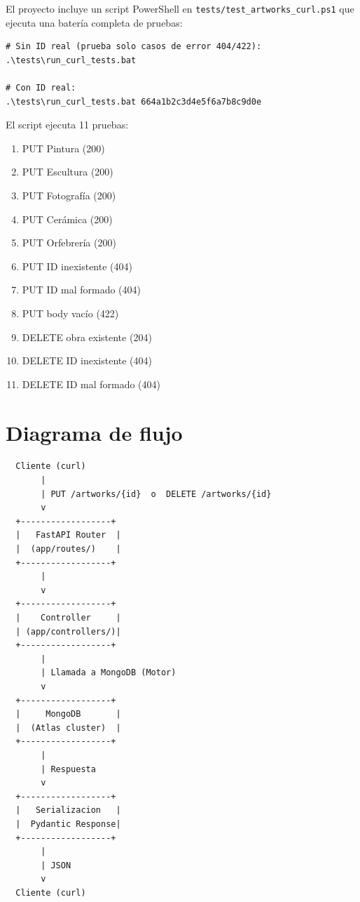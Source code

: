 \documentclass[12pt,a4paper]{article}
\begin{document}
El proyecto incluye un script PowerShell en \texttt{tests/test\_artworks\_curl.ps1}
que ejecuta una batería completa de pruebas:

\begin{lstlisting}[style=bash, caption=Ejecutar batería de pruebas]
# Sin ID real (prueba solo casos de error 404/422):
.\tests\run_curl_tests.bat

# Con ID real:
.\tests\run_curl_tests.bat 664a1b2c3d4e5f6a7b8c9d0e
\end{lstlisting}

El script ejecuta 11 pruebas:

\begin{enumerate}
    \item PUT Pintura (200)
    \item PUT Escultura (200)
    \item PUT Fotografía (200)
    \item PUT Cerámica (200)
    \item PUT Orfebrería (200)
    \item PUT ID inexistente (404)
    \item PUT ID mal formado (404)
    \item PUT body vacío (422)
    \item DELETE obra existente (204)
    \item DELETE ID inexistente (404)
    \item DELETE ID mal formado (404)
\end{enumerate}

\section{Diagrama de flujo}

\begin{center}
\begin{minipage}{0.9\textwidth}
\footnotesize
\begin{verbatim}
  Cliente (curl)
       |
       | PUT /artworks/{id}  o  DELETE /artworks/{id}
       v
  +------------------+
  |   FastAPI Router  |
  |  (app/routes/)    |
  +------------------+
       |
       v
  +------------------+
  |    Controller     |
  | (app/controllers/)|
  +------------------+
       |
       | Llamada a MongoDB (Motor)
       v
  +------------------+
  |     MongoDB       |
  |  (Atlas cluster)  |
  +------------------+
       |
       | Respuesta
       v
  +------------------+
  |   Serializacion   |
  |  Pydantic Response|
  +------------------+
       |
       | JSON
       v
  Cliente (curl)
\end{verbatim}
\end{minipage}
\end{center}
\end{document}
